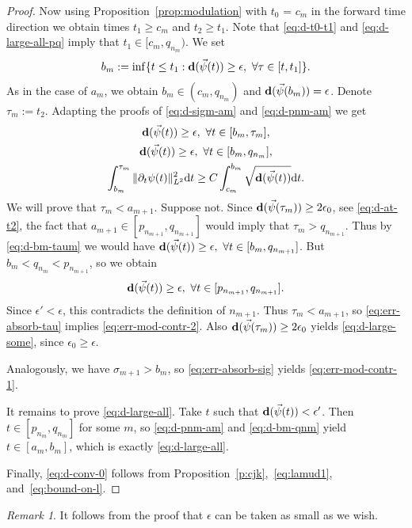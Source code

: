 \documentclass[10pt,reqno]{amsart}
\newcommand{\EQ}[1]{\begin{equation}\begin{split} #1 \end{split}\end{equation}}
\numberwithin{equation}{section}
\theoremstyle{remark}
\newtheorem{rem}[thm]{Remark}
\newcommand{\ud}{\mathrm{d}}
\newcommand{\0}{\emptyset}
\newcommand{\eps}{\epsilon}
\newcommand{\bfd}{{\bf d}}
\begin{document}
\begin{proof}
Now using Proposition~\ref{prop:modulation} with $t_0$ = $c_m$ in the forward time direction
we obtain times $t_1 \geq c_m$ and $t_2 \geq t_1$.
Note that \eqref{eq:d-t0-t1} and \eqref{eq:d-large-all-pq} imply that $t_1 \in [c_m, q_{n_m})$.
We set
\EQ{
b_m := \inf\{t \leq t_1: \bfd(\vec\psi(t)) \geq \eps,\ \forall \tau\in[t, t_1]\}.
}
As in the case of $a_m$, we obtain $b_m \in (c_m, q_{n_m})$ and $\bfd(\vec\psi(b_m)) = \eps$.
Denote $\tau_m := t_2$. Adapting the proofs of \eqref{eq:d-sigm-am} and \eqref{eq:d-pnm-am} we get
\begin{gather}
\label{eq:d-bm-taum}
\bfd(\vec\psi(t)) \geq \eps,\ \forall t \in [b_m, \tau_m], \\
\label{eq:d-bm-qnm}
\bfd(\vec\psi(t)) \geq \eps,\ \forall t \in [b_m, q_{n_m}], \\
\label{eq:err-absorb-tau}
\int_{b_m}^{\tau_m} \|\partial_t\psi(t)\|_{L^2}^2\ud t \geq C\int_{c_m}^{b_m}\sqrt{\bfd(\vec \psi(t))}\ud t.
\end{gather}
We will prove that $\tau_m < a_{m+1}$. Suppose not. Since $\bfd(\vec\psi(\tau_m)) \geq 2\eps_0$,
see \eqref{eq:d-at-t2}, the fact that $a_{m+1} \in [p_{n_{m+1}}, q_{n_{m+1}}]$ would imply
that $\tau_m > q_{n_{m+1}}$. Thus by \eqref{eq:d-bm-taum} we would have
$\bfd(\vec\psi(t)) \geq \eps,\ \forall t \in [b_m, q_{n_{m+1}}]$. But $b_m < q_{n_m} < p_{n_{m+1}}$,
so we obtain
\EQ{
\bfd(\vec\psi(t)) \geq \eps,\ \forall t \in [p_{n_{m+1}}, q_{n_{m+1}}].
}
Since $\eps' < \eps$, this contradicts the definition of $n_{m+1}$.
Thus $\tau_m < a_{m+1}$, so \eqref{eq:err-absorb-tau} implies \eqref{eq:err-mod-contr-2}.
Also $\bfd(\vec\psi(\tau_m)) \geq 2\eps_0$ yields \eqref{eq:d-large-some}, since $\eps_0 \geq \eps$.

Analogously, we have $\sigma_{m+1} > b_m$, so \eqref{eq:err-absorb-sig} yields \eqref{eq:err-mod-contr-1}.

It remains to prove \eqref{eq:d-large-all}.
Take $t$ such that $\bfd(\vec\psi(t)) < \eps'$.
Then $t \in [p_{n_m}, q_{n_m}]$ for some $m$,
so \eqref{eq:d-pnm-am} and \eqref{eq:d-bm-qnm} yield $t\in[a_m, b_m]$,
which is exactly \eqref{eq:d-large-all}.

Finally, \eqref{eq:d-conv-0} follows from Proposition~\ref{p:cjk},~\eqref{eq:lamud1}, and~\eqref{eq:bound-on-l}.%
\end{proof}
\begin{rem}\label{rem:eps-small}
It follows from the proof that $\eps$ can be taken as small as we wish.
\end{rem}
\end{document}
